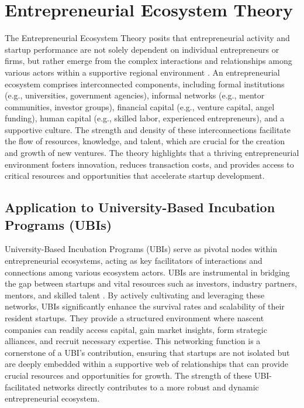 \documentclass[../Main.tex]{subfiles}
\begin{document}
\section{Entrepreneurial Ecosystem Theory}

The Entrepreneurial Ecosystem Theory posits that entrepreneurial activity and startup performance are not solely dependent on individual entrepreneurs or firms, but rather emerge from the complex interactions and relationships among various actors within a supportive regional environment \cite{spigel2017relational}. An entrepreneurial ecosystem comprises interconnected components, including formal institutions (e.g., universities, government agencies), informal networks (e.g., mentor communities, investor groups), financial capital (e.g., venture capital, angel funding), human capital (e.g., skilled labor, experienced entrepreneurs), and a supportive culture. The strength and density of these interconnections facilitate the flow of resources, knowledge, and talent, which are crucial for the creation and growth of new ventures. The theory highlights that a thriving entrepreneurial environment fosters innovation, reduces transaction costs, and provides access to critical resources and opportunities that accelerate startup development.

\subsection{Application to University-Based Incubation Programs (UBIs)}
University-Based Incubation Programs (UBIs) serve as pivotal nodes within entrepreneurial ecosystems, acting as key facilitators of interactions and connections among various ecosystem actors. UBIs are instrumental in bridging the gap between startups and vital resources such as investors, industry partners, mentors, and skilled talent \cite{theodorakopoulos2014business}. By actively cultivating and leveraging these networks, UBIs significantly enhance the survival rates and scalability of their resident startups. They provide a structured environment where nascent companies can readily access capital, gain market insights, form strategic alliances, and recruit necessary expertise. This networking function is a cornerstone of a UBI's contribution, ensuring that startups are not isolated but are deeply embedded within a supportive web of relationships that can provide crucial resources and opportunities for growth. The strength of these UBI-facilitated networks directly contributes to a more robust and dynamic entrepreneurial ecosystem.
\end{document}
